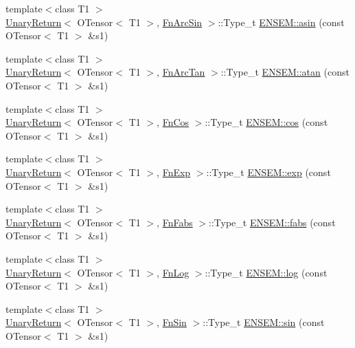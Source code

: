 \begin{DoxyCompactItemize}
\item 
{\footnotesize template$<$class T1 $>$ }\\\mbox{\hyperlink{structUnaryReturn}{Unary\+Return}}$<$ O\+Tensor$<$ T1 $>$, \mbox{\hyperlink{structFnArcSin}{Fn\+Arc\+Sin}} $>$\+::Type\+\_\+t \mbox{\hyperlink{group__obstensor_gac2f3c33b51a9ad0b1d382eb02ba089df}{E\+N\+S\+E\+M\+::asin}} (const O\+Tensor$<$ T1 $>$ \&s1)
\item 
{\footnotesize template$<$class T1 $>$ }\\\mbox{\hyperlink{structUnaryReturn}{Unary\+Return}}$<$ O\+Tensor$<$ T1 $>$, \mbox{\hyperlink{structFnArcTan}{Fn\+Arc\+Tan}} $>$\+::Type\+\_\+t \mbox{\hyperlink{group__obstensor_gad2ff83f1912b705b331d775f9c4dfb5a}{E\+N\+S\+E\+M\+::atan}} (const O\+Tensor$<$ T1 $>$ \&s1)
\item 
{\footnotesize template$<$class T1 $>$ }\\\mbox{\hyperlink{structUnaryReturn}{Unary\+Return}}$<$ O\+Tensor$<$ T1 $>$, \mbox{\hyperlink{structFnCos}{Fn\+Cos}} $>$\+::Type\+\_\+t \mbox{\hyperlink{group__obstensor_gab6c0f7f88211609a81b1ab43c346d285}{E\+N\+S\+E\+M\+::cos}} (const O\+Tensor$<$ T1 $>$ \&s1)
\item 
{\footnotesize template$<$class T1 $>$ }\\\mbox{\hyperlink{structUnaryReturn}{Unary\+Return}}$<$ O\+Tensor$<$ T1 $>$, \mbox{\hyperlink{structFnExp}{Fn\+Exp}} $>$\+::Type\+\_\+t \mbox{\hyperlink{group__obstensor_ga6403c57fdf642c4972f11c2251aff2ef}{E\+N\+S\+E\+M\+::exp}} (const O\+Tensor$<$ T1 $>$ \&s1)
\item 
{\footnotesize template$<$class T1 $>$ }\\\mbox{\hyperlink{structUnaryReturn}{Unary\+Return}}$<$ O\+Tensor$<$ T1 $>$, \mbox{\hyperlink{structFnFabs}{Fn\+Fabs}} $>$\+::Type\+\_\+t \mbox{\hyperlink{group__obstensor_ga246cc858f35ed63a911bfa33abd22d98}{E\+N\+S\+E\+M\+::fabs}} (const O\+Tensor$<$ T1 $>$ \&s1)
\item 
{\footnotesize template$<$class T1 $>$ }\\\mbox{\hyperlink{structUnaryReturn}{Unary\+Return}}$<$ O\+Tensor$<$ T1 $>$, \mbox{\hyperlink{structFnLog}{Fn\+Log}} $>$\+::Type\+\_\+t \mbox{\hyperlink{group__obstensor_ga256d486f79c6bee5428762a951322949}{E\+N\+S\+E\+M\+::log}} (const O\+Tensor$<$ T1 $>$ \&s1)
\item 
{\footnotesize template$<$class T1 $>$ }\\\mbox{\hyperlink{structUnaryReturn}{Unary\+Return}}$<$ O\+Tensor$<$ T1 $>$, \mbox{\hyperlink{structFnSin}{Fn\+Sin}} $>$\+::Type\+\_\+t \mbox{\hyperlink{group__obstensor_gaa4e4751f0d9a575eaac0fb52f7bb0c73}{E\+N\+S\+E\+M\+::sin}} (const O\+Tensor$<$ T1 $>$ \&s1)

\end{DoxyCompactItemize}
